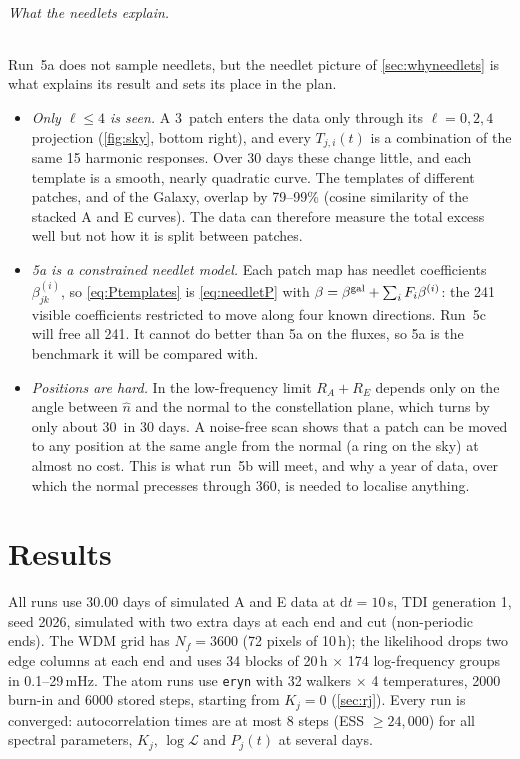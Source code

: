\documentclass[11pt,a4paper]{article}
\newcommand{\dd}{\mathrm{d}}
\begin{document}
\paragraph{What the needlets explain.} Run~5a does not sample needlets, but the
needlet picture of \cref{sec:whyneedlets} is what explains its result and sets its
place in the plan.
\begin{itemize}
  \item \emph{Only $\ell\le4$ is seen.} A 3\textdegree\ patch enters the data only
        through its $\ell=0,2,4$ projection (\cref{fig:sky}, bottom right), and every
        $T_{j,i}(t)$ is a combination of the same 15 harmonic responses. Over 30 days
        these change little, and each template is a smooth, nearly quadratic curve.
        The templates of different patches, and of the Galaxy, overlap by 79--99\%
        (cosine similarity of the stacked A and E curves). The data can therefore
        measure the total excess well but not how it is split between patches.
  \item \emph{5a is a constrained needlet model.} Each patch map has needlet
        coefficients $\beta^{(i)}_{jk}$, so \cref{eq:Ptemplates} is \cref{eq:needletP}
        with $\beta=\beta^{\rm gal}+\sum_iF_i\beta^{(i)}$: the 241 visible coefficients
        restricted to move along four known directions. Run~5c will free all 241. It
        cannot do better than 5a on the fluxes, so 5a is the benchmark it will be
        compared with.
  \item \emph{Positions are hard.} In the low-frequency limit $R_A+R_E$ depends only on
        the angle between $\hat n$ and the normal to the constellation plane, which
        turns by only about 30\textdegree\ in 30 days. A noise-free scan shows that a
        patch can be moved to any position at the same angle from the normal (a ring
        on the sky) at almost no cost. This is what run~5b will meet, and why a year
        of data, over which the normal precesses through 360\textdegree, is needed to
        localise anything.
\end{itemize}

\clearpage
\part{Results}

All runs use 30.00 days of simulated A and E data at $\dd t=10$\,s, TDI generation 1,
seed 2026, simulated with two extra days at each end and cut (non-periodic ends). The
WDM grid has $N_f=3600$ (72 pixels of 10\,h); the likelihood drops two edge columns at
each end and uses 34 blocks of 20\,h $\times$ 174 log-frequency groups in
0.1--29\,mHz. The atom runs use \texttt{eryn} with 32 walkers $\times$ 4 temperatures,
2000 burn-in and 6000 stored steps, starting from $K_j=0$ (\cref{sec:rj}). Every run
is converged: autocorrelation times are at most 8 steps (ESS $\ge24{,}000$) for all
spectral parameters, $K_j$, $\log\mathcal L$ and $P_j(t)$ at several days.
\end{document}
